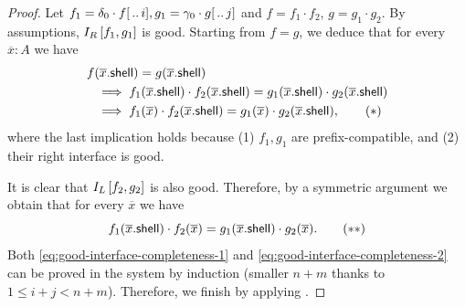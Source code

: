 \begin{proof}
    Let $f_1 = \delta_0 \cdot f[\,..\,i], g_1 = \gamma_0 \cdot g[\,..\,j]$ and $f = f_1 \cdot f_2$, $g = g_1 \cdot g_2$. By assumptions, $I_R \left[ f_1, g_1 \right]$ is good. Starting from $f = g$, we deduce that for every $\overline x : A$ we have
    \begin{align*}
        f&(\overline x . \mathsf{shell}) = g(\overline x . \mathsf{shell}) \\
        &\implies f_1(\overline x . \mathsf{shell}) \cdot f_2(\overline x . \mathsf{shell}) = g_1(\overline x . \mathsf{shell}) \cdot g_2(\overline x . \mathsf{shell}) \\
        &\implies f_1(\overline x) \cdot f_2(\overline{x} . \mathsf{shell}) = g_1(\overline x) \cdot g_2(\overline x . \mathsf{shell}), \tag{$*$}\label{eq:good-interface-completeness-1}
    \end{align*}
    where the last implication holds because (1) $f_1,g_1$ are prefix-compatible, and (2) their right interface is good.

    It is clear that $I_L \left[ f_2, g_2 \right]$ is also good. Therefore, by a symmetric argument we obtain that for every $\overline x$ we have
    \[
        f_1(\overline x . \mathsf{shell}) \cdot f_2(\overline x) = g_1(\overline x . \mathsf{shell}) \cdot g_2(\overline x). \tag{$**$}\label{eq:good-interface-completeness-2}
    \]
    Both \eqref{eq:good-interface-completeness-1} and \eqref{eq:good-interface-completeness-2} can be proved in the system by induction (smaller $n + m$ thanks to $1 \leq i+j < n +m$). Therefore, we finish by applying .
\end{proof}

